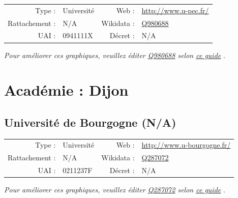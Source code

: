\documentclass[11pt,french,landscape]{article}
\begin{document}
\begin{tabular*}{0.45\textwidth}{rp{2cm}rl}  
\hline  
Type : & Université & Web : &\href{http://www.u-pec.fr/}{http://www.u-pec.fr/} \\  
Rattachement : & N/A & Wikidata : & \href{https://www.wikidata.org/entity/Q980688}{Q980688} \\  
UAI : & 0941111X & Décret : & N/A \\  
\hline  
\end{tabular*}

\textit{\scriptsize Pour améliorer ces graphiques, veuillez éditer \href{https://www.wikidata.org/entity/Q980688}{Q980688}  selon \href{https://github.com/cpesr/wikidataESR/blob/master/Rmd/wikidataESR.md}{ce guide}}
.


\newpage

\hypertarget{acaduxe9mie-dijon}{%
\section{Académie : Dijon}\label{acaduxe9mie-dijon}}

\hypertarget{universituxe9-de-bourgogne-na}{%
\subsection{Université de Bourgogne
(N/A)}\label{universituxe9-de-bourgogne-na}}

\begin{tabular*}{0.45\textwidth}{rp{2cm}rl}  
\hline  
Type : & Université & Web : &\href{http://www.u-bourgogne.fr/}{http://www.u-bourgogne.fr/} \\  
Rattachement : & N/A & Wikidata : & \href{https://www.wikidata.org/entity/Q287072}{Q287072} \\  
UAI : & 0211237F & Décret : & N/A \\  
\hline  
\end{tabular*}

\textit{\scriptsize Pour améliorer ces graphiques, veuillez éditer \href{https://www.wikidata.org/entity/Q287072}{Q287072}  selon \href{https://github.com/cpesr/wikidataESR/blob/master/Rmd/wikidataESR.md}{ce guide}}
.

\end{document}
